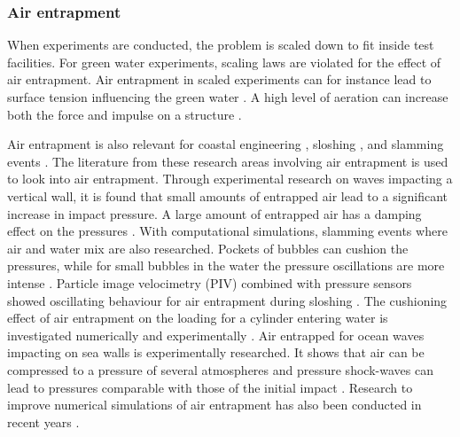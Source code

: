 \subsubsection{Air entrapment}
\label{sec:lit_air_entrapment}
When experiments are conducted, the problem is scaled down to fit inside test facilities. 
For green water experiments, scaling laws are violated for the effect of air entrapment. Air entrapment in scaled experiments can for instance lead to surface tension influencing the green water \cite{Greco2005}. 
A high level of aeration can increase both the force and impulse on a structure \cite{Ariyarathne2012}. 
\par 
Air entrapment is also relevant for coastal engineering \cite{Chan1994}, sloshing \cite{Lugni2006}, and slamming events \cite{Guzel2019}. The literature from these research areas involving air entrapment is used to look into air entrapment. Through experimental research on waves impacting a vertical wall, it is found that small amounts of entrapped air lead to a significant increase in impact pressure. A large amount of entrapped air has a damping effect on the pressures \cite{Hattori1994}. With computational simulations, slamming events where air and water mix are also researched. Pockets of bubbles can cushion the pressures, while for small bubbles in the water the pressure oscillations are more intense \cite{Sun2019}. Particle image velocimetry (PIV) combined with pressure sensors showed oscillating behaviour for air entrapment during sloshing \cite{Lugni2006}. The cushioning effect of air entrapment on the loading for a cylinder entering water is investigated numerically and experimentally \cite{Guzel2019}. Air entrapped for ocean waves impacting on sea walls is experimentally researched. It shows that air can be compressed to a pressure of several atmospheres and pressure shock-waves can lead to pressures comparable with those of the initial impact \cite{Bredmose2009}. Research to improve numerical simulations of air entrapment has also been conducted in recent years \cite{Sun2019, VanDerEijk2020}.


